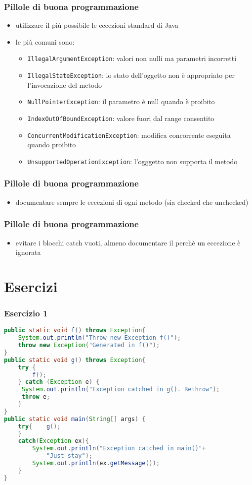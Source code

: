 \documentclass{beamer}
\begin{document}
\begin{frame}[fragile]
\frametitle{Pillole di buona programmazione}
\begin{itemize}
\item utilizzare il pi\`u possibile le eccezioni standard di Java
\item le pi\`u comuni sono:
\begin{itemize}
\item \texttt{IllegalArgumentException}: valori non nulli ma parametri incorretti
\item \texttt{IllegalStateException}: lo stato dell'oggetto non \`e appropriato per l'invocazione del metodo 
\item \texttt{NullPointerException}: il parametro \`e null quando \`e proibito
\item \texttt{IndexOutOfBoundException}: valore fuori dal range consentito
\item \texttt{ConcurrentModificationException}: modifica concorrente eseguita quando proibito
\item \texttt{UnsupportedOperationException}: l'ogggetto non supporta il metodo
\end{itemize}
\end{itemize}
\end{frame}

\begin{frame}[fragile]
\frametitle{Pillole di buona programmazione}
\begin{itemize}
\item  documentare sempre le eccezioni di ogni metodo (sia checked che unchecked)
 \end{itemize}
\end{frame}


\begin{frame}[fragile]
\frametitle{Pillole di buona programmazione}
\begin{itemize}
\item  evitare i blocchi catch vuoti, almeno documentare il perch\`e un eccezione \`e ignorata
 \end{itemize}
\end{frame}



\section{Esercizi}


\begin{frame}[fragile]
\frametitle{Esercizio 1}
\begin{lstlisting}[language=Java]
public static void f() throws Exception{
    System.out.println("Throw new Exception f()");
    throw new Exception("Generated in f()");
}
public static void g() throws Exception{
    try {
        f();
    } catch (Exception e) {
     System.out.println("Exception catched in g(). Rethrow");
     throw e;
    }
}
public static void main(String[] args) {
    try{    g();
    }
    catch(Exception ex){
        System.out.println("Exception catched in main()"+
            "Just stay");
        System.out.println(ex.getMessage());
    }
}
\end{lstlisting}
\end{frame}
\end{document}
